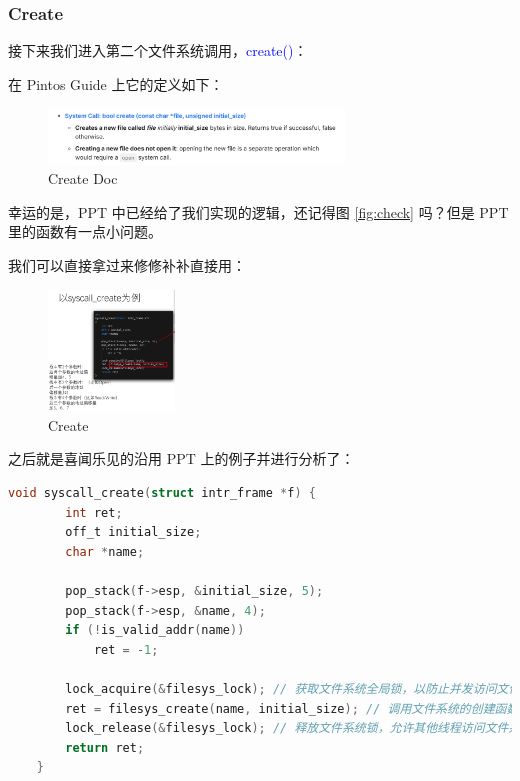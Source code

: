 \documentclass[14pt,a4paper,UTF8,twoside]{article}
\renewcommand{\texttt}[1]{\textcolor{blue}{\ttfamily #1}}
\begin{document}
\subsubsection{Create}

接下来我们进入第二个文件系统调用，\texttt{create()}：

在 Pintos Guide 上它的定义如下：

\begin{figure}[H]
    \centering
    \includegraphics[width=0.7\textwidth]{img6/createdoc.png}
    \caption{Create Doc}
    \label{fig:create}
\end{figure}

幸运的是，PPT 中已经给了我们实现的逻辑，还记得图 \ref{fig:check} 吗？但是 PPT 里的函数有一点小问题。

我们可以直接拿过来修修补补直接用：

\begin{figure}[H]
    \centering
    \includegraphics[width=0.3\textwidth]{img6/fix.png}
    \caption{Create}
    \label{fig:create_fix}
\end{figure}

之后就是喜闻乐见的沿用 PPT 上的例子并进行分析了：

\begin{lstlisting}[language=C, title= syscall\_create()]
    void syscall_create(struct intr_frame *f) {
        int ret;
        off_t initial_size;
        char *name;
    
        pop_stack(f->esp, &initial_size, 5);
        pop_stack(f->esp, &name, 4);
        if (!is_valid_addr(name))
            ret = -1;
    
        lock_acquire(&filesys_lock); // 获取文件系统全局锁，以防止并发访问文件系统时发生数据竞争
        ret = filesys_create(name, initial_size); // 调用文件系统的创建函数，它的返回值为 bool
        lock_release(&filesys_lock); // 释放文件系统锁，允许其他线程访问文件系统
        return ret;
    }
\end{lstlisting}
\end{document}
